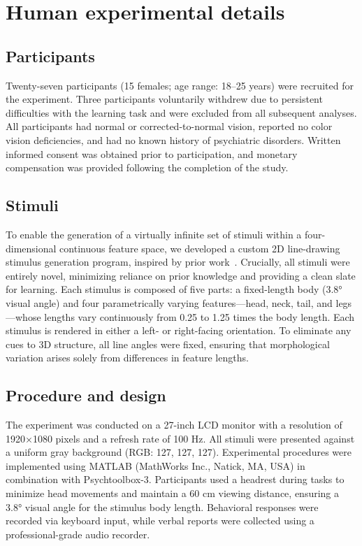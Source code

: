\section{Human experimental details}
\label{sec: experiment}


\subsection{Participants} \label{sec: A.1}
Twenty-seven participants (15 females; age range: 18–25 years) were recruited for the experiment. Three participants voluntarily withdrew due to persistent difficulties with the learning task and were excluded from all subsequent analyses. All participants had normal or corrected-to-normal vision, reported no color vision deficiencies, and had no known history of psychiatric disorders. Written informed consent was obtained prior to participation, and monetary compensation was provided following the completion of the study.

\subsection{Stimuli} \label{sec: A.2}
To enable the generation of a virtually infinite set of stimuli within a four-dimensional continuous feature space, we developed a custom 2D line-drawing stimulus generation program, inspired by prior work~\cite{OLMAN2004227, NIPS2007_89d4402d}. Crucially, all stimuli were entirely novel, minimizing reliance on prior knowledge and providing a clean slate for learning. Each stimulus is composed of five parts: a fixed-length body (3.8° visual angle) and four parametrically varying features—head, neck, tail, and legs—whose lengths vary continuously from 0.25 to 1.25 times the body length. Each stimulus is rendered in either a left- or right-facing orientation. To eliminate any cues to 3D structure, all line angles were fixed, ensuring that morphological variation arises solely from differences in feature lengths.


\subsection{Procedure and design} \label{sec: A.3}
The experiment was conducted on a 27-inch LCD monitor with a resolution of 1920×1080 pixels and a refresh rate of 100 Hz. All stimuli were presented against a uniform gray background (RGB: 127, 127, 127). Experimental procedures were implemented using MATLAB (MathWorks Inc., Natick, MA, USA) in combination with Psychtoolbox-3. Participants used a headrest during tasks to minimize head movements and maintain a 60 cm viewing distance, ensuring a 3.8° visual angle for the stimulus body length. Behavioral responses were recorded via keyboard input, while verbal reports were collected using a professional-grade audio recorder. 

